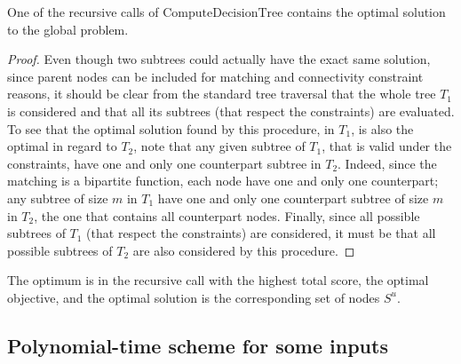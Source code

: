    			\begin{proposition}
   				One of the recursive calls of $\text{ComputeDecisionTree}$ contains the optimal solution to the global problem.
   			\end{proposition}
   			\begin{proof}
   				Even though two subtrees could actually have the exact same solution, since parent nodes can be included for matching and connectivity constraint reasons, it should be clear from the standard tree traversal that the whole tree $T_1$ is considered and that all its subtrees (that respect the constraints) are evaluated.
   				To see that the optimal solution found by this procedure, in $T_1$, is also the optimal in regard to $T_2$, note that any given subtree of $T_1$, that is valid under the constraints, have one and only one counterpart subtree in $T_2$.
   				Indeed, since the matching is a bipartite function, each node have one and only one counterpart; any subtree of size $m$ in $T_1$ have one and only one counterpart subtree of size $m$ in $T_2$, the one that contains all counterpart nodes.
   				Finally, since all possible subtrees of $T_1$ (that respect the constraints) are considered, it must be that all possible subtrees of $T_2$ are also considered by this procedure.
   			\end{proof}
   
   			The optimum is in the recursive call with the highest total score, the optimal objective, and the optimal solution is the corresponding set of nodes $S^u$.
   
   
		\subsection{Polynomial-time scheme for some inputs}
		\label{subsec:enumerable}

